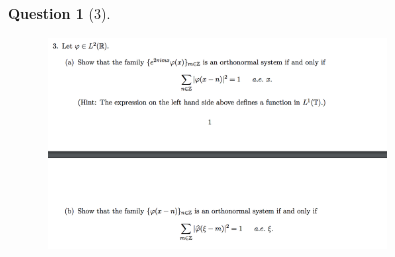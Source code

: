 \documentclass{article} %
\theoremstyle{quest}
\newtheorem*{question}{Question}
\begin{document}
\begin{question}[3]
\hfill
\begin{figure}[h!]
  \centering
    \includegraphics[width=0.8\textwidth]{HA-5-3.png}
\end{figure}
\end{question}
\end{document}
